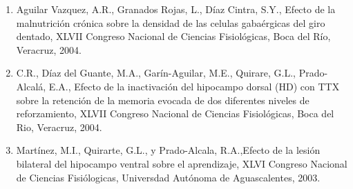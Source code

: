 \begin{enumerate}
\item Aguilar Vazquez, A.R., Granados Rojas, L., Díaz Cintra, S.Y., Efecto de la malnutrición crónica sobre la densidad de las 
celulas gabaérgicas del giro dentado, XLVII Congreso Nacional de Ciencias Fisiológicas, Boca del Río, Veracruz, 2004.

\item C.R., Díaz del Guante, M.A., Garín-Aguilar, M.E., Quirare, G.L., Prado-Alcalá, E.A., Efecto de la inactivación del 
hipocampo dorsal (HD) con TTX sobre la retención de la memoria evocada de dos diferentes niveles de reforzamiento, XLVII 
Congreso Nacional de Ciencias Fisiológicas, Boca del Rio, Veracruz, 2004.

\item Martínez, M.I., Quirarte, G.L., y Prado-Alcala, R.A.,Efecto de la lesión bilateral del hipocampo ventral sobre el 
aprendizaje, XLVI Congreso Nacional de Ciencias Fisiólogicas, Universdad Autónoma de Aguascalentes, 2003.

\end{enumerate}
